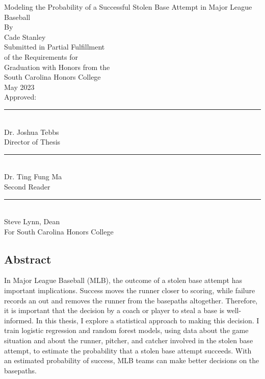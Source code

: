 \documentclass{article}
\begin{document}
\begin{titlepage}
    \begin{center}
        Modeling the Probability of a Successful Stolen Base Attempt in Major League Baseball \\
        \vspace{0.5cm}
        By \\
        \vspace{0.75cm}
        Cade Stanley \\
        \vspace{1.75cm}
        Submitted in Partial Fulfillment \\
        of the Requirements for \\
        Graduation with Honors from the \\
        South Carolina Honors College \\
        \vspace{1.5cm}
        May 2023 \\
        \vspace{1.5cm}
        Approved: \\
        \vspace{1.5cm}
        \rule{12cm}{0.4pt} \\
        Dr. Joshua Tebbs \\
        Director of Thesis \\
        \vspace{1.5cm}
        \rule{12cm}{0.4pt} \\
        Dr. Ting Fung Ma \\
        Second Reader \\
        \vspace{1.5cm}
        \rule{12cm}{0.4pt} \\
        Steve Lynn, Dean \\
        For South Carolina Honors College
    \end{center}
\end{titlepage}


\newpage
\begin{center}
    \section*{Abstract}
\end{center}
In Major League Baseball (MLB), the outcome of a stolen base attempt has important implications. Success moves the runner closer to scoring, while failure records an out and removes the runner from the basepaths altogether. Therefore, it is important that the decision by a coach or player to steal a base is well-informed. In this thesis, I explore a statistical approach to making this decision. I train logistic regression and random forest models, using data about the game situation and about the runner, pitcher, and catcher involved in the stolen base attempt, to estimate the probability that a stolen base attempt succeeds. With an estimated probability of success, MLB teams can make better decisions on the basepaths.
\end{document}
